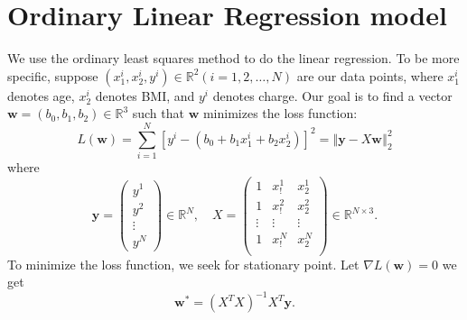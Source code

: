 \documentclass[12pt,a4paper]{article}
\begin{document}
\section{Ordinary Linear Regression model}
\newcommand{\x}{\mathbf{x}}
\newcommand{\y}{\mathbf{y}}
\newcommand{\w}{\mathbf{w}}
\newcommand{\norm}[1]{\left\Vert #1 \right\Vert}
We use the ordinary least squares method to do the linear regression. To be more specific, suppose $(x_1^i,x_2^i,y^i)\in \mathbb{R}^2 (i=1,2,\dots,N)$ are our data points, where $x_1^i$ denotes age, $x_2^i$ denotes BMI, and $y^i$ denotes charge. Our goal is to find a vector $\w = (b_0,b_1,b_2)\in \mathbb{R}^3$ such that $\w$ minimizes the loss function:
$$
L(\w) = \sum_{i=1}^{N}\left[ y^i - (b_0+b_1x_1^i+b_2x_2^i)\right]^2 = \norm{\y - X\w}_2^2
$$
where 
$$
\y = 
\begin{pmatrix}
y^1 \\ y^2 \\ \vdots \\y^N
\end{pmatrix}\in \mathbb{R}^N, \quad
X = 
\begin{pmatrix}
1 & x_!^1 & x_2^1 \\
1 & x_!^2 & x_2^2 \\
\vdots & \vdots & \vdots \\
1 & x_!^N & x_2^N \\
\end{pmatrix}\in \mathbb{R}^{N\times 3}.
$$
To minimize the loss function, we seek for stationary point. Let $\nabla L(\w)=0$ we get
$$ \w^{*} = (X^T X)^{-1}X^T \y.$$
\end{document}
